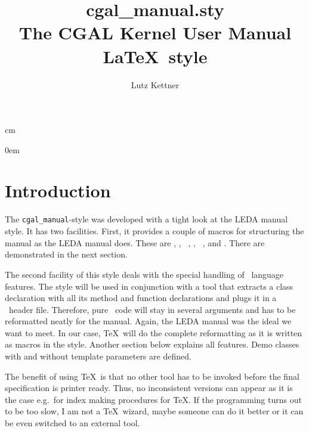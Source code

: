 \textwidth 15.4cm 
 cm
\topmargin -14mm       
\evensidemargin 3mm 
\oddsidemargin 3mm



\parindent0em
\setlength{\parskip}{1ex minus 0.9ex}

\sloppy

\title {cgal\_manual.sty\\
        The CGAL Kernel User Manual \LaTeX\ style\\
        \vspace{5mm}
        \CCrevision}
\author{Lutz Kettner}

\date{\CCdate}



\maketitle

\section{Introduction}

The {\tt cgal\_manual}-style was developed with a tight look at the
LEDA manual style. It has two facilities. First, it provides a couple
of macros for structuring the manual as the LEDA manual does. These
are {\tt \string{}}, {\tt \string\creation}, {\tt
  \string\operations}, {\tt \string\implementation}, {\tt
  \string\example}, and {\tt \string\precond}. There are demonstrated
in the next section.

The second facility of this style deals with the special handling of
\CC\ language features. The style will be used in conjunction with a
tool that extracts a class declaration with all its method and
function declarations and plugs it in a \CC\ header file. Therefore,
pure \CC\ code will stay in several arguments and has to be
reformatted neatly for the manual. Again, the LEDA manual was the
ideal we want to meet. In our case, \TeX\ will do the complete
reformatting as it is written as macros in the style. Another
section below explains all features. Demo classes with and without
template parameters are defined.

The benefit of using \TeX\ is that no other tool has to be invoked
before the final specification is printer ready. Thus, no inconsistent
versions can appear as it is the case e.g.\ for index making
procedures for \TeX. If the programming turns out to be too slow, I am
not a \TeX\ wizard, maybe someone can do it better or it can be even
switched to an external tool.

